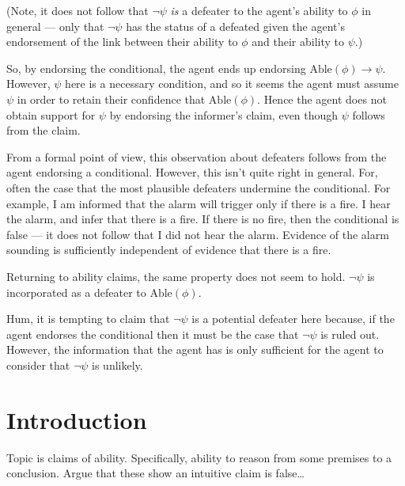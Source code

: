 \documentclass[10pt]{article}
\begin{document}
(Note, it does not follow that \(\lnot\psi\) \emph{is} a defeater to the agent's ability to \(\phi\) in general --- only that \(\lnot\psi\) has the status of a defeated given the agent's endorsement of the link between their ability to \(\phi\) and their ability to \(\psi\).)

So, by endorsing the conditional, the agent ends up endorsing \(\text{Able}(\phi) \rightarrow \psi\).
However, \(\psi\) here is a necessary condition, and so it seems the agent must assume \(\psi\) in order to retain their confidence that \(\text{Able}(\phi)\).
Hence the agent does not obtain support for \(\psi\) by endorsing the informer's claim, even though \(\psi\) follows from the claim.

From a formal point of view, this observation about defeaters follows from the agent endorsing a conditional.
However, this isn't quite right in general.
For, often the case that the most plausible defeaters undermine the conditional.
For example, I am informed that the alarm will trigger only if there is a fire.
I hear the alarm, and infer that there is a fire.
If there is no fire, then the conditional is false --- it does not follow that I did not hear the alarm.
Evidence of the alarm sounding is sufficiently independent of evidence that there is a fire.

Returning to ability claims, the same property does not seem to hold.
\(\lnot\psi\) is incorporated as a defeater to \(\text{Able}(\phi)\).

Hum, it is tempting to claim that \(\lnot\psi\) is a potential defeater here because, if the agent endorses the conditional then it must be the case that \(\lnot\psi\) is ruled out.
However, the information that the agent has is only sufficient for the agent to consider that \(\lnot\psi\) is unlikely.

\newpage

\maketitle

\section{Introduction}
\label{sec:introduction-1}


{
  \color{red}
  Topic is claims of ability.
  Specifically, ability to reason from some premises to a conclusion.
  Argue that these show an intuitive claim is false\dots
}
\end{document}
